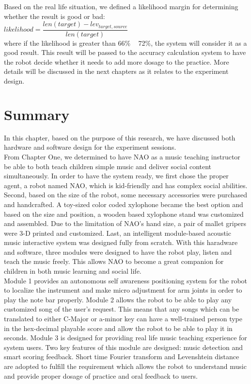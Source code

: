 Based on the real life situation, we defined a likelihood margin for determining whether the result
is good or bad: \\
  
${likelihood = \dfrac{len(target) - lev_{target,source}}{len(target)}}$\\

where if the likelihood is greater than 66\% ~ 72\%, the system will consider it as a good result.
This result will be passed to the accuracy calculation system to have the robot decide whether it
needs to add more dosage to the practice. More details will be discussed in the next chapters
as it relates to the experiment design.\\

\section{Summary}
In this chapter, based on the purpose of this research, we have discussed both hardware
and software design for the experiment sessions.\\

From Chapter One, we determined to have NAO as a music teaching instructor be able
to both teach children simple music and deliver social content simultaneously.
In order to have the system ready, we first chose the proper agent, a robot named NAO, which is
kid-friendly and has complex social abilities. Second, based on the size of the robot, some necessary
accessories were purchased and handcrafted. A toy-sized color coded xylophone became the
best option and based on the size and position, a wooden based xylophone stand was 
customized and assembled. Due to the limitation of NAO's hand size, a pair of mallet gripers 
were 3-D printed and customized. Last, an intelligent module-based acoustic music 
interactive system was designed fully from scratch. With this haradware and software, 
three modules were designed to have the robot play, listen and teach the music freely. This allows
NAO to become a great companion for children in both music learning and social life. \\

Module 1 provides an autonomous self awareness positioning system for the robot to localize
the instrument and make micro adjustment for arm joints in order to play the note bar properly.
Module 2 allows the robot to be able to play any customized song of the user's request. This
means that any songs which can be translated to either C-Major or a-minor key can have a well-trained
person type in the hex-decimal playable score and allow the robot to be able to play it in seconds. Module 3
is designed for providing real life music teaching experience for system users. Two key features
of this module are designed: music detection and smart scoring feedback. Short time Fourier transform
and Levenshtein distance are adopted to fulfill the requirement which allows the robot to understand
music and provide proper dosage of practice and oral feedback to users.\\



